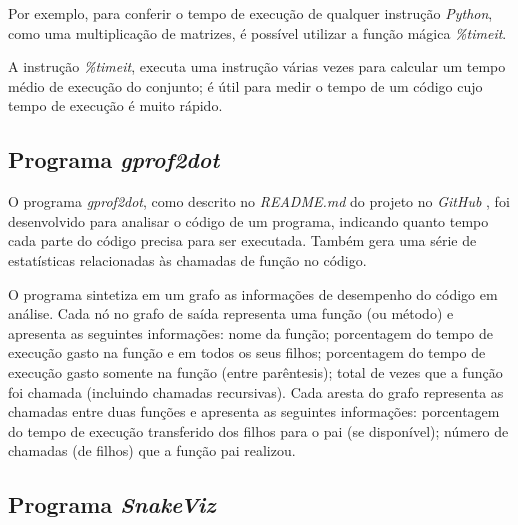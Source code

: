 \documentclass[12pt]{article}
\begin{document}
Por exemplo, para conferir o tempo de execução de qualquer instrução \textit{Python}, como uma multiplicação de matrizes, é possível utilizar a função mágica \textit{\%timeit}.

A instrução \textit{\%timeit}, executa uma instrução várias vezes para calcular um tempo médio de execução do conjunto; é útil para medir o tempo de um código cujo tempo de execução é muito rápido. 

\subsection{Programa \textit{gprof2dot}}


O programa \textit{gprof2dot}, como descrito no \textit{README.md} do projeto no \textit{GitHub} \cite{fonseca:2022}, foi desenvolvido para analisar o código de um programa, indicando quanto tempo cada parte do código precisa para ser executada. Também gera uma série de estatísticas relacionadas às chamadas de função no código.

O programa sintetiza em um grafo as informações de desempenho do código em análise. Cada nó no grafo de saída representa uma função (ou método) e apresenta as seguintes informações: nome da função; porcentagem do tempo de execução gasto na função e em todos os seus filhos; porcentagem do tempo de execução gasto somente na função (entre parêntesis); total de vezes que a função foi chamada (incluindo chamadas recursivas). Cada aresta do grafo representa as chamadas entre duas funções e apresenta as seguintes informações: porcentagem do tempo de execução transferido dos filhos para o pai (se disponível); número de chamadas (de filhos) que a função pai realizou.


%

\subsection{Programa \textit{SnakeViz}}
\end{document}
